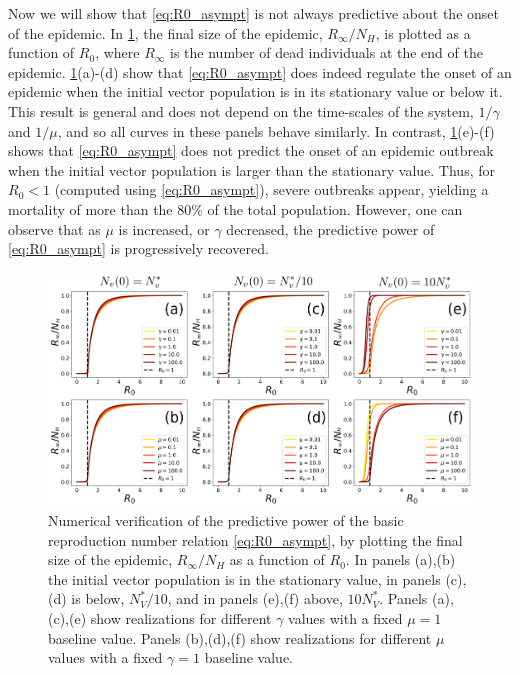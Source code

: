 Now we will show that \cref{eq:R0_asympt} is not always predictive about the
onset of the epidemic. In \cref{fig:R0_check_stationary}, the final size of the
epidemic, $R_{\infty}/N_H$, is plotted as a function of $R_0$, where $R_\infty$
is the number of dead individuals at the end of the epidemic.
\cref{fig:R0_check_stationary}(a)-(d) show that \cref{eq:R0_asympt} does indeed
regulate the onset of an epidemic when the initial vector population is in its
stationary value or below it. This result is general and does not depend on the
time-scales of the system, $1/\gamma$ and $1/\mu$, and so all curves in these
panels behave similarly. In contrast, \cref{fig:R0_check_stationary}(e)-(f)
shows that \cref{eq:R0_asympt} does not predict the onset of an epidemic
outbreak when the initial vector population is larger than the stationary
value. Thus, for $R_0<1$ (computed using  \cref{eq:R0_asympt}), severe
outbreaks appear, yielding a mortality of more than the 80\% of the total
population. However, one can observe that  as $\mu$ is increased, or $\gamma$
decreased, the predictive power of \cref{eq:R0_asympt} is progressively
recovered.

\begin{figure}[t!]
    \centering
    \includegraphics[width=\textwidth]{Figures/R0_check_stationary.pdf}
    \caption[
        Numerical verification of the predictive power of the
        stationary basic reproduction number
    ]{Numerical verification of the predictive	power of the basic
        reproduction number relation \cref{eq:R0_asympt}, by plotting the final
        size of the epidemic, $R_\infty/N_H$ as a function of $R_0$. In panels
        (a),(b) the initial vector population is in the stationary value, in
        panels (c),(d) is below, $N_V^*/10$, and in panels (e),(f) above, $10
            N_V^*$. Panels (a),(c),(e) show realizations for different $\gamma$
        values with a fixed $\mu=1$ baseline value. Panels (b),(d),(f) show
        realizations for different $\mu$ values with a fixed $\gamma=1$
        baseline value.}
    \label{fig:R0_check_stationary}
\end{figure}

